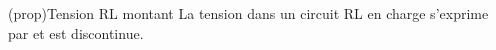 \documentclass[../../main/main.tex]{subfiles}
\begin{document}
\begin{tcb*}[label=prop:url-charge, sidebyside, righthand ratio=.3]
	(prop){Tension RL montant}
	La tension dans un circuit RL en charge s'exprime par
	\psw{%
		\[
			\boxed{u_L(t) = E\exp \left(-\frac{t}{\tau} \right)}
		\]
	}%
	et est discontinue.
	\tcblower
	\begin{center}
	\end{center}
\end{tcb*}
\end{document}
